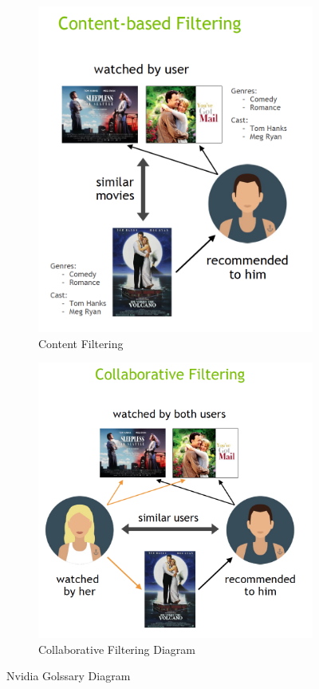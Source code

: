 \begin{figure}[H]
    \centering
    \begin{subfigure}{.5\textwidth}
        \centering
        \includegraphics[width=0.8\linewidth]{assets/content_based_filtering.png}
        \caption{Content Filtering}
        \label{fig:content-filtering}
    \end{subfigure}%
    \begin{subfigure}{.5\textwidth}
        \centering
        \includegraphics[width=0.95\linewidth]{assets/collaborative_filtering.png}
        \caption{Collaborative Filtering Diagram}
        \label{fig:collaborative-filtering}
    \end{subfigure}
    \caption[Nvidia Golssary Diagram]{Nvidia Golssary Diagram \cite{NvidiaRecSys}}
\end{figure}


